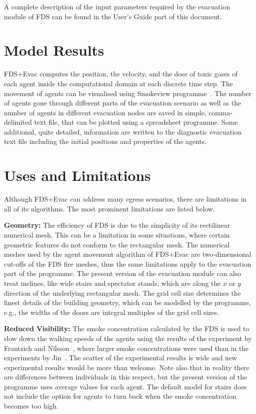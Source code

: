 \documentclass[12pt,a4paper,final,twoside]{stylevk}
\begin{document}
A complete description of the input parameters required by the
evacuation module of FDS can be found in the User's Guide part of this
document.


\section{Model Results}

\noindent FDS+Evac computes the position, the velocity, and the dose
of toxic gases of each agent inside the computational domain at each
discrete time step.  The movement of agents can be visualised using
Smokeview programme~\cite{SV_UserGuide}.  The number of agents gone
through different parts of the evacuation scenario as well as the
number of agents in different evacuation nodes are saved in simple,
comma-delimited text file, that can be plotted using a spreadsheet
programme.  Some additional, quite detailed, information are written
to the diagnostic evacuation text file including the initial positions
and properties of the agents.


\section{Uses and Limitations}\label{Sec_UsesAndLimit}

\noindent Although FDS+Evac can address many egress scenarios, there
are limitations in all of its algorithms.  The most prominent
limitations are listed below.


\textbf{Geometry:} The efficiency of FDS is due to the simplicity
of its rectilinear numerical mesh.  This can be a limitation in some
situations, where certain geometric features do not conform to the
rectangular mesh.  The numerical meshes used by the agent movement
algorithm of FDS+Evac are two-dimensional cut-offs of the FDS fire
meshes, thus the same limitations apply to the evacuation part of the
programme.  The present version of the evacuation module can also
treat inclines, like wide stairs and spectator stands, which are along
the $x$ or $y$ direction of the underlying rectangular mesh.  The grid
cell size determines the finest details of the building geometry,
which can be modelled by the programme, e.g., the widths of the
doors are integral multiples of the grid cell sizes.


\textbf{Reduced Visibility:} The smoke concentration calculated by the
FDS is used to slow down the walking speeds of the agents using the
results of the experiment by Frantzich and Nilsson~\cite{Frantzich03},
where larger smoke concentrations were used than in the experiments by
Jin~\cite{Jin78}.  The scatter of the experimental results is wide and
new experimental results would be more than welcome.  Note also that
in reality there are differences between individuals in this respect,
but the present version of the programme uses average values for each
agent.  The default model for stairs does not include the option for
agents to turn back when the smoke concentration becomes too high.
\end{document}
